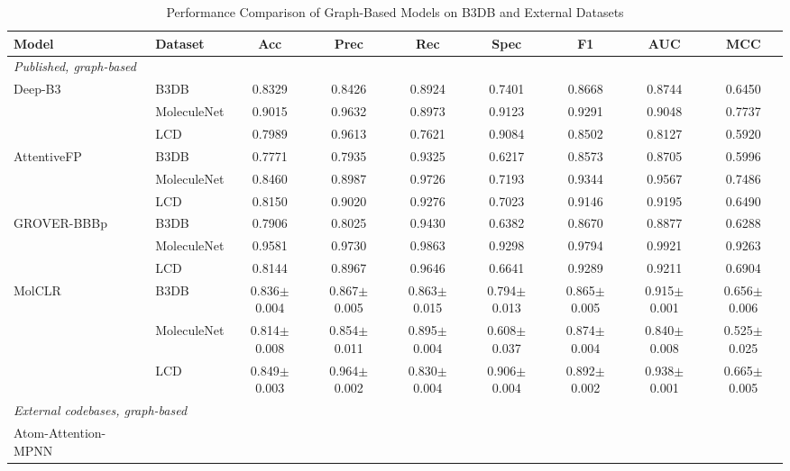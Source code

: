 \documentclass[conference]{IEEEtran}
\begin{document}
\begin{table}[htbp]
\caption{Performance Comparison of Graph-Based Models on B3DB and External Datasets}
\label{tab:model_comparison_graph}
\centering
\footnotesize
\renewcommand{\arraystretch}{1.3}
\begin{tabular}{llccccccc}
\hline
\textbf{Model} & \textbf{Dataset} & \textbf{Acc} & \textbf{Prec} & \textbf{Rec} & \textbf{Spec} & \textbf{F1} & \textbf{AUC} & \textbf{MCC} \\
\hline
\multicolumn{9}{l}{\textit{Published, graph-based}} \\
\hline
\multirow{3}{*}{Deep-B3}
    & B3DB        & 0.8329 & 0.8426 & 0.8924 & 0.7401 & 0.8668 & 0.8744 & 0.6450 \\
    & MoleculeNet & 0.9015 & 0.9632 & 0.8973 & 0.9123 & 0.9291 & 0.9048 & 0.7737 \\
    & LCD      & 0.7989 & 0.9613 & 0.7621 & 0.9084 & 0.8502 & 0.8127 & 0.5920 \\
\hline
\multirow{3}{*}{AttentiveFP}
    & B3DB        & 0.7771 & 0.7935 & 0.9325 & 0.6217 & 0.8573 & 0.8705 & 0.5996 \\
    & MoleculeNet & 0.8460 & 0.8987 & 0.9726 & 0.7193 & 0.9344 & 0.9567 & 0.7486 \\
    & LCD      & 0.8150 & 0.9020 & 0.9276 & 0.7023 & 0.9146 & 0.9195 & 0.6490 \\
\hline
\multirow{3}{*}{GROVER-BBBp}
    & B3DB        & 0.7906 & 0.8025 & 0.9430 & 0.6382 & 0.8670 & 0.8877 & 0.6288 \\
    & MoleculeNet & 0.9581 & 0.9730 & 0.9863 & 0.9298 & 0.9794 & 0.9921 & 0.9263 \\
    & LCD      & 0.8144 & 0.8967 & 0.9646 & 0.6641 & 0.9289 & 0.9211 & 0.6904 \\
\hline
\multirow{3}{*}{MolCLR}
    & B3DB        & 0.836$\pm$0.004 & 0.867$\pm$0.005 & 0.863$\pm$0.015 & 0.794$\pm$0.013 & 0.865$\pm$0.005 & 0.915$\pm$0.001 & 0.656$\pm$0.006 \\
    & MoleculeNet & 0.814$\pm$0.008 & 0.854$\pm$0.011 & 0.895$\pm$0.004 & 0.608$\pm$0.037 & 0.874$\pm$0.004 & 0.840$\pm$0.008 & 0.525$\pm$0.025 \\
    & LCD      & 0.849$\pm$0.003 & 0.964$\pm$0.002 & 0.830$\pm$0.004 & 0.906$\pm$0.004 & 0.892$\pm$0.002 & 0.938$\pm$0.001 & 0.665$\pm$0.005 \\
\hline
\multicolumn{9}{l}{\textit{External codebases, graph-based}} \\
\hline
\multirow{3}{*}{Atom-Attention-MPNN}

\end{tabular}
\end{table}
\end{document}
